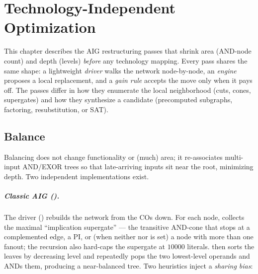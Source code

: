 \chapter{Technology-Independent Optimization}
\label{ch:opt}

This chapter describes the AIG restructuring passes that shrink area (AND-node
count) and depth (levels) \emph{before} any technology mapping. Every pass shares
the same shape: a lightweight \emph{driver} walks the network node-by-node, an
\emph{engine} proposes a local replacement, and a \emph{gain rule} accepts the
move only when it pays off. The passes differ in how they enumerate the local
neighborhood (cuts, cones, supergates) and how they synthesize a candidate
(precomputed subgraphs, factoring, resubstitution, or SAT).


\section{Balance}
\label{sec:opt-balance}

Balancing does not change functionality or (much) area; it re-associates
multi-input AND/EXOR trees so that late-arriving inputs sit near the root,
minimizing depth. Two independent implementations exist.

\paragraph{Classic AIG ().}
The driver  () rebuilds the
network from the COs down. For each node,  collects the
maximal ``implication supergate'' --- the transitive AND-cone that stops at a
complemented edge, a PI, or (when neither  nor  is
set) a node with more than one fanout; the recursion also hard-caps the supergate
at $10000$ literals.  then sorts the leaves by
decreasing level and repeatedly pops the two lowest-level operands and ANDs them,
producing a near-balanced tree. Two heuristics inject a \emph{sharing bias}:

